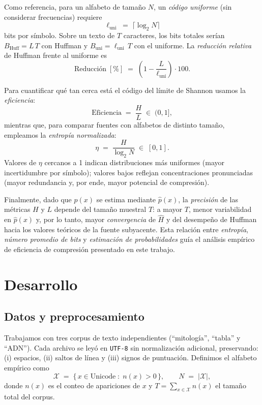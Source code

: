 \documentclass[12pt, a4paper]{article}
\begin{document}
Como referencia, para un alfabeto de tamaño \(N\), un \emph{código uniforme} (sin considerar frecuencias) requiere
\[
\ell_{\text{uni}} \;=\; \big\lceil \log_2 N \big\rceil
\]
bits por símbolo. Sobre un texto de \(T\) caracteres, los bits totales serían \(B_{\text{Huff}}=L\,T\) con Huffman y \(B_{\text{uni}}=\ell_{\text{uni}}\,T\) con el uniforme. La \emph{reducción relativa} de Huffman frente al uniforme es
\[
\text{Reducción}\;[\%] \;=\; \left(1-\frac{L}{\ell_{\text{uni}}}\right)\cdot 100.
\]

Para cuantificar qué tan cerca está el código del límite de Shannon usamos la \emph{eficiencia}:
\[
\text{Eficiencia} \;=\; \frac{H}{L} \;\in\; (0,1],
\]
mientras que, para comparar fuentes con alfabetos de distinto tamaño, empleamos la \emph{entropía normalizada}:
\[
\eta \;=\; \frac{H}{\log_2 N} \;\in\; [0,1].
\]
Valores de \(\eta\) cercanos a 1 indican distribuciones más uniformes (mayor incertidumbre por símbolo); valores bajos reflejan concentraciones pronunciadas (mayor redundancia y, por ende, mayor potencial de compresión).

Finalmente, dado que \(p(x)\) se estima mediante \(\hat p(x)\), la \emph{precisión} de las métricas \(H\) y \(L\) depende del tamaño muestral \(T\): a mayor \(T\), menor variabilidad en \(\hat p(x)\) y, por lo tanto, mayor \emph{convergencia} de \(\hat H\) y del desempeño de Huffman hacia los valores teóricos de la fuente subyacente. Esta relación entre \emph{entropía}, \emph{número promedio de bits} y \emph{estimación de probabilidades} guía el análisis empírico de eficiencia de compresión presentado en este trabajo.

\section*{Desarrollo}

\subsection*{Datos y preprocesamiento}
Trabajamos con tres corpus de texto independientes (``mitología'', ``tabla'' y ``ADN''). Cada archivo se leyó en \texttt{UTF-8} sin normalización adicional, preservando:
(i) espacios, (ii) saltos de línea y (iii) signos de puntuación. 
Definimos el alfabeto empírico como
\[
\mathcal{X} \;=\; \{\, x \in \text{Unicode} \;:\; n(x) > 0 \,\},
\qquad N \;=\; |\mathcal{X}|,
\]
donde $n(x)$ es el conteo de apariciones de $x$ y $T=\sum_{x\in\mathcal{X}} n(x)$ el tamaño total del corpus.
\end{document}
